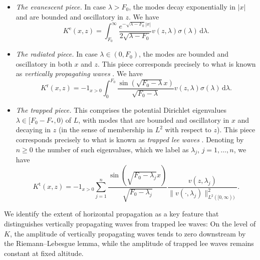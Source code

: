 \documentclass[11pt,twoside,reqno,centertags]{amsart}
\theoremstyle{definition}
\newcommand{\dd}{\mathrm d}
\begin{document}
\begin{itemize}
	\item \emph{The evanescent piece.} In case $\lambda > F_0$, the modes decay exponentially in $|x|$ and are bounded and oscillatory in $z$. We have
	\begin{equation}\label{eq:K^e}
		K^{\mathrm{e}}(x,z) = \int_{F_0}^\infty\frac{e^{-\sqrt{\lambda-F_0}|x|}}{2\sqrt{\lambda-F_0}}v(z,\lambda)\sigma(\lambda)\,\dd\lambda.
	\end{equation}
	\item \emph{The radiated piece.} In case $\lambda \in (0,F_0)$, the modes are bounded and oscillatory in both $x$ and $z$. This piece corresponds precisely to what is known as \emph{vertically propagating waves} \cite{Smith79}. We have
	\begin{equation}\label{eq:K^r}
		K^{\mathrm{r}}(x,z) = -1_{x>0}\int_0^{F_0}\frac{\sin(\sqrt{F_0-\lambda}x)}{\sqrt{F_0-\lambda}}v(z,\lambda)\sigma(\lambda)\,\dd\lambda.
	\end{equation}
	\item \emph{The trapped piece.} This comprises the potential Dirichlet eigenvalues $\lambda\in [F_0-F_*,0)$ of $L$, with modes that are bounded and oscillatory in $x$ and decaying in $z$ (in the sense of membership in $L^2$ with respect to $z$). This piece corresponds precisely to what is known as \emph{trapped lee waves} \cite{Smith79}. Denoting by $n\ge0$ the number of such eigenvalues, which we label as $\lambda_j$, $j=1,\ldots,n$, we have
	\begin{equation}\label{eq:K^t}
		K^{\mathrm{t}}(x,z) = - 1_{x>0}\sum_{j=1}^n \frac{\sin(\sqrt{F_0-\lambda_j}x)}{\sqrt{F_0-\lambda_j}}\frac{v(z,\lambda_j)}{\|v(\cdot,\lambda_j)\|_{L^2([0,\infty))}^2}.
	\end{equation}
\end{itemize}
We identify the extent of horizontal propagation as a key feature that distinguishes vertically propagating waves from trapped lee waves: On the level of $K$, the amplitude of vertically propagating waves tends to zero downstream by the Riemann--Lebesgue lemma, while the amplitude of trapped lee waves remains constant at fixed altitude.
\end{document}

